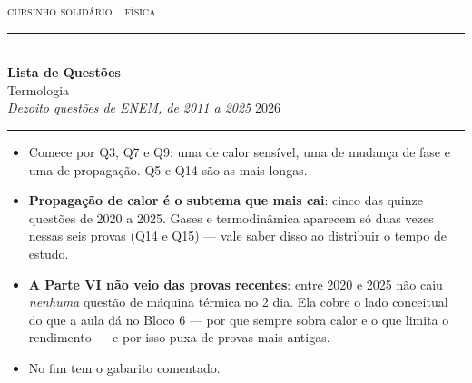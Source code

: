 \documentclass[11pt,a4paper]{article}
\begin{document}

\thispagestyle{empty}

{\scshape\color{vinho}cursinho solid\'ario \,\textperiodcentered\, f\'isica}\\[-0.5em]
{\color{vinho}\rule{\linewidth}{1.6pt}}\\[0.9em]
{\huge\bfseries Lista de Quest\~oes}\\[0.35em]
{\LARGE Termologia}\\[0.7em]
{\itshape\color{grafite}Dezoito quest\~oes de ENEM, de 2011 a 2025}
\hfill {\color{grafite}2026}\\[-0.3em]
{\color{black!30}\rule{\linewidth}{0.5pt}}

\vspace{1.0em}

\begin{painel}
\begin{itemize}[nosep, leftmargin=1.5em]
  \item Comece por Q3, Q7 e Q9: uma de calor sens\'ivel, uma de mudan\c{c}a de
        fase e uma de propaga\c{c}\~ao. Q5 e Q14 s\~ao as mais longas.
  \item \textbf{Propaga\c{c}\~ao de calor \'e o subtema que mais cai}: cinco
        das quinze quest\~oes de 2020 a 2025. Gases e termodin\^amica
        aparecem s\'o duas vezes nessas seis provas (Q14 e Q15) --- vale
        saber disso ao distribuir o tempo de estudo.
  \item \textbf{A Parte VI n\~ao veio das provas recentes}: entre 2020 e
        2025 n\~ao caiu \emph{nenhuma} quest\~ao de m\'aquina t\'ermica no
        2\textordmasculine{} dia. Ela cobre o lado conceitual do que a
        aula d\'a no Bloco 6 --- por que sempre sobra calor e o que
        limita o rendimento --- e por isso puxa de provas mais antigas.
  \item No fim tem o gabarito comentado.
\end{itemize}
\end{painel}

\newpage
\end{document}
